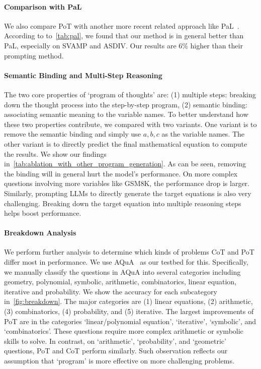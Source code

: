 \paragraph{Comparison with PaL} We also compare PoT with another more recent related approach like PaL~\citep{gao2022pal}. According to to~\autoref{tab:pal}, we found that our method is in general better than PaL, especially on SVAMP and ASDIV. Our results are 6\% higher than their prompting method.

\paragraph{Semantic Binding and Multi-Step Reasoning} The two core properties of `program of thoughts' are: (1) multiple steps: breaking down the thought process into the step-by-step program, (2) semantic binding: associating semantic meaning to the variable names. To better understand how these two properties contribute, we compared with two variants. One variant is to remove the semantic binding and simply use $a,b,c$ as the variable names. The other variant is to directly predict the final mathematical equation to compute the results. We show our findings in~\autoref{tab:ablation_with_other_program_generation}. As can be seen, removing the binding will in general hurt the model's performance. On more complex questions involving more variables like GSM8K, the performance drop is larger. Similarly, prompting LLMs to directly generate the target equations is also very challenging. Breaking down the target equation into multiple reasoning steps helps boost performance.

\paragraph{Breakdown Analysis} We perform further analysis to determine which kinds of problems CoT and PoT differ most in performance. We use AQuA~\citep{ling2017program} as our testbed for this. Specifically, we manually classify the questions in AQuA into several categories including geometry, polynomial, symbolic, arithmetic, combinatorics, linear equation, iterative and probability. We show the accuracy for each subcategory in~\autoref{fig:breakdown}. The major categories are (1) linear equations, (2) arithmetic, (3) combinatorics, (4) probability, and (5) iterative. The largest improvements of PoT are in the categories `linear/polynomial equation', `iterative', `symbolic', and `combinatorics'. These questions require more complex arithmetic or symbolic skills to solve. In contrast, on `arithmetic', `probability', and `geometric' questions, PoT and CoT perform similarly. Such observation reflects our assumption that `program' is more effective on more challenging problems. 

